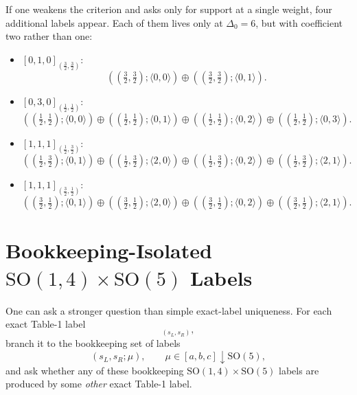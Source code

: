 \documentclass[12pt]{article}
\newcommand{\SO}{\mathrm{SO}}
\newcommand{\D}{\Delta}
\newcommand{\la}{\langle}
\newcommand{\ra}{\rangle}
\begin{document}
If one weakens the criterion and asks only for support at a single weight, four additional labels appear.
Each of them lives only at $\D_0=6$, but with coefficient two rather than one:
\begin{itemize}
\item $[0,1,0]_{(\frac{3}{2},\frac{3}{2})}$:
\begin{equation}
((\tfrac{3}{2},\tfrac{3}{2});\la 0,0\ra)\oplus ((\tfrac{3}{2},\tfrac{3}{2});\la 0,1\ra).
\end{equation}
\item $[0,3,0]_{(\frac{1}{2},\frac{1}{2})}$:
\begin{equation}
((\tfrac{1}{2},\tfrac{1}{2});\la 0,0\ra)\oplus ((\tfrac{1}{2},\tfrac{1}{2});\la 0,1\ra)\oplus
((\tfrac{1}{2},\tfrac{1}{2});\la 0,2\ra)\oplus ((\tfrac{1}{2},\tfrac{1}{2});\la 0,3\ra).
\end{equation}
\item $[1,1,1]_{(\frac{1}{2},\frac{3}{2})}$:
\begin{equation}
((\tfrac{1}{2},\tfrac{3}{2});\la 0,1\ra)\oplus ((\tfrac{1}{2},\tfrac{3}{2});\la 2,0\ra)\oplus
((\tfrac{1}{2},\tfrac{3}{2});\la 0,2\ra)\oplus ((\tfrac{1}{2},\tfrac{3}{2});\la 2,1\ra).
\end{equation}
\item $[1,1,1]_{(\frac{3}{2},\frac{1}{2})}$:
\begin{equation}
((\tfrac{3}{2},\tfrac{1}{2});\la 0,1\ra)\oplus ((\tfrac{3}{2},\tfrac{1}{2});\la 2,0\ra)\oplus
((\tfrac{3}{2},\tfrac{1}{2});\la 0,2\ra)\oplus ((\tfrac{3}{2},\tfrac{1}{2});\la 2,1\ra).
\end{equation}
\end{itemize}

\section{Bookkeeping-Isolated \texorpdfstring{$\SO(1,4)\times \SO(5)$}{SO(1,4)xSO(5)} Labels}

One can ask a stronger question than simple exact-label uniqueness. For each exact Table-1 label
\begin{equation}
[a,b,c]_{(s_L,s_R)},
\end{equation}
branch it to the bookkeeping set of labels
\begin{equation}
(s_L,s_R;\mu),\qquad \mu\in [a,b,c]\downarrow \SO(5),
\end{equation}
and ask whether any of these bookkeeping $\SO(1,4)\times \SO(5)$ labels are produced by
some \emph{other} exact Table-1 label.
\end{document}
